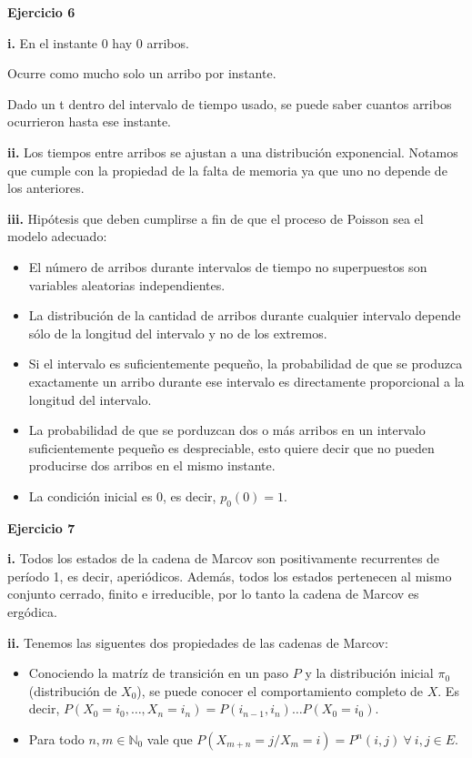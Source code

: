 \documentclass[11pt]{article}
\begin{document}
\textbf{Ejercicio 6}

\textbf{i.}
En el instante 0 hay 0 arribos.

Ocurre como mucho solo un arribo por instante.

Dado un t dentro del intervalo de tiempo usado, se puede saber cuantos arribos ocurrieron hasta ese instante.

\textbf{ii.}
Los tiempos entre arribos se ajustan a una distribución exponencial. Notamos que cumple con la propiedad de la falta de memoria ya que uno no depende de los anteriores.

\textbf{iii.}
Hipótesis que deben cumplirse a fin de que el proceso de Poisson sea el modelo adecuado:

\begin{itemize}
    \item El número de arribos durante intervalos de tiempo no superpuestos son variables aleatorias independientes.
    \item La distribución de la cantidad de arribos durante cualquier intervalo depende sólo de la longitud del intervalo y no de los extremos.
    \item Si el intervalo es suficientemente pequeño, la probabilidad de que se produzca exactamente un arribo durante ese intervalo es directamente proporcional a la longitud del intervalo.
    \item La probabilidad de que se porduzcan dos o más arribos en un intervalo suficientemente pequeño es despreciable, esto quiere decir que no pueden producirse dos arribos en el mismo instante.
    \item La condición inicial es 0, es decir, $p_0(0) = 1$.
\end{itemize}


\textbf{Ejercicio 7}

\textbf{i.}
Todos los estados de la cadena de Marcov son positivamente recurrentes de período 1, es decir, aperiódicos. Además, todos los estados pertenecen al mismo conjunto cerrado, finito e irreducible, por lo tanto la cadena de Marcov es ergódica.

\textbf{ii.}
Tenemos las siguentes dos propiedades de las cadenas de Marcov:

\begin{itemize}
    \item Conociendo la matríz de transición en un paso $P$ y la distribución inicial $\pi_0$ (distribución de $X_0$), se puede conocer el comportamiento completo de $X$. Es decir, $P(X_0 = i_0, \dots, X_n = i_n) = P(i_{n-1}, i_n) \dots P(X_0 = i_0)$.
    \item Para todo $n,m \in \mathbb{N}_0$ vale que $P(X_{m+n} = j / X_m = i) = P^n(i,j) \ \forall\ i,j \in E$.
\end{itemize}
\end{document}

